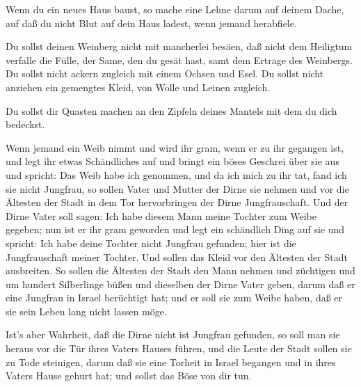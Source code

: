  Wenn du ein neues Haus baust, so mache eine Lehne darum auf
deinem Dache, auf daß du nicht Blut auf dein Haus ladest, wenn jemand
herabfiele.

 Du sollst deinen Weinberg nicht mit mancherlei besäen, daß
nicht dem Heiligtum verfalle die Fülle, der Same, den du gesät hast,
samt dem Ertrage des Weinbergs.  Du sollst nicht ackern
zugleich mit einem Ochsen und Esel.  Du sollst nicht
anziehen ein gemengtes Kleid, von Wolle und Leinen zugleich.

 Du sollst dir Quasten machen an den Zipfeln deines Mantels
mit dem du dich bedeckst.

 Wenn jemand ein Weib nimmt und wird ihr gram, wenn er zu
ihr gegangen ist,  und legt ihr etwas Schändliches auf und
bringt ein böses Geschrei über sie aus und spricht: Das Weib habe ich
genommen, und da ich mich zu ihr tat, fand ich sie nicht Jungfrau,
 so sollen Vater und Mutter der Dirne sie nehmen und vor
die Ältesten der Stadt in dem Tor hervorbringen der Dirne
Jungfrauschaft.  Und der Dirne Vater soll sagen: Ich habe
diesem Mann meine Tochter zum Weibe gegeben; nun ist er ihr gram
geworden  und legt ein schändlich Ding auf sie und spricht:
Ich habe deine Tochter nicht Jungfrau gefunden; hier ist die
Jungfrauschaft meiner Tochter. Und sollen das Kleid vor den Ältesten der
Stadt ausbreiten.  So sollen die Ältesten der Stadt den
Mann nehmen und züchtigen  und um hundert Silberlinge büßen
und dieselben der Dirne Vater geben, darum daß er eine Jungfrau in
Israel berüchtigt hat; und er soll sie zum Weibe haben, daß er sie sein
Leben lang nicht lassen möge.

 Ist's aber Wahrheit, daß die Dirne nicht ist Jungfrau
gefunden,  so soll man sie heraus vor die Tür ihres Vaters
Hauses führen, und die Leute der Stadt sollen sie zu Tode steinigen,
darum daß sie eine Torheit in Israel begangen und in ihres Vaters Hause
gehurt hat; und sollst das Böse von dir tun.

